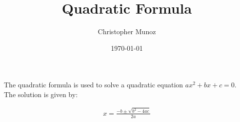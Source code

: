 \documentclass{article}
\begin{document}
\title{Quadratic Formula}
\author{Christopher Munoz}
\date{\today}

\maketitle

The quadratic formula is used to solve a quadratic equation $ax^2 + bx + c = 0$. The solution is given by:

\begin{equation}
\begin{aligned}
x = \frac{-b \pm \sqrt{b^2 - 4ac}}{2a}
\end{aligned}
\end{equation}
\end{document}
